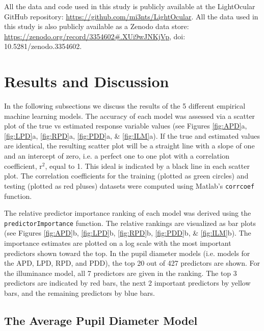 \documentclass[10pt]{article}
\begin{document}
All the data and code used in this study is publicly available at the LightOcular GitHub repository: \url{https://github.com/mi3nts/LightOcular}. All the data used in this study is also publicly available as a Zenodo data store: \url{https://zenodo.org/record/3354602#.XUi9wJNKjVp}, doi: 10.5281/zenodo.3354602.

\section{Results and Discussion}

In the following subsections we discuss the results of the 5 different empirical machine learning models. The accuracy of each model was assessed via a scatter plot of the true vs estimated response variable values (see Figures \ref{fig:APD}a, \ref{fig:LPD}a, \ref{fig:RPD}a, \ref{fig:PDD}a, \& \ref{fig:ILM}a). If the true and estimated values are identical, the resulting scatter plot will be a straight line with a slope of one and an intercept of zero, i.e. a perfect one to one plot with a correlation coefficient, r$^{2}$, equal to 1. This ideal is indicated by a black line in each scatter plot. The correlation coefficients for the training (plotted as green circles) and testing (plotted as red pluses) datasets were computed using Matlab's \texttt{corrcoef} function.

The relative predictor importance ranking of each model was derived using the \texttt{predictorImportance} function. The relative rankings are visualized as bar plots (see Figures \ref{fig:APD}b, \ref{fig:LPD}b, \ref{fig:RPD}b, \ref{fig:PDD}b, \& \ref{fig:ILM}b). The importance estimates are plotted on a log scale with the most important predictors shown toward the top. In the pupil diameter models (i.e. models for the APD, LPD, RPD, and PDD), the top 20 out of 427 predictors are shown. For the illuminance model, all 7 predictors are given in the ranking. The top 3 predictors are indicated by red bars, the next 2 important predictors by yellow bars, and the remaining predictors by blue bars.

\subsection{The Average Pupil Diameter Model}
\end{document}
